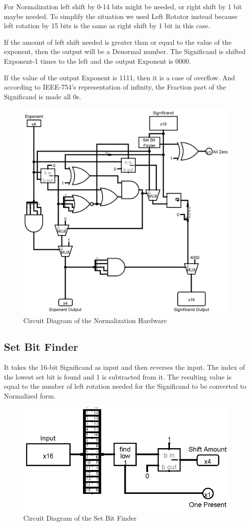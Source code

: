 \documentclass[12pt, a4paper]{article}
\begin{document}
	For Normalization left shift by 0-14 bits might be needed, or right shift by 1 bit maybe needed. To simplify the situation we used
	Left Rotator instead because left rotation by 15 bits is the same as right shift by 1 bit in this case.

	If the amount of left shift needed is greater than or equal to the value of the exponent, then the output will be a Denormal number.
	The Significand is shifted Exponent-1 times to the left and the output Exponent is 0000.

	If the value of the output Exponent is 1111, then it is a case of overflow. And according to IEEE-754's representation of infinity, the Fraction part of the Significand is made all 0s.
	\begin{figure}[h!]
		\centering
		\includegraphics[width = 0.7\linewidth]{nhw}
		\caption{Circuit Diagram of the Normalization Hardware}
		\label{fig8}
	\end{figure}
	\subsection{Set Bit Finder}
	It takes the 16-bit Significand as input and then reverses the input. The index of the lowest set bit is found and 1 is subtracted from it. The resulting value is equal to the number of left rotation needed for the Significand to be converted to Normalized form.
	\begin{figure}[h!]
		\centering
		\includegraphics[width = 0.8\linewidth]{setbit}
		\caption{Circuit Diagram of the Set Bit Finder}
		\label{fig9}
	\end{figure}
\end{document}
